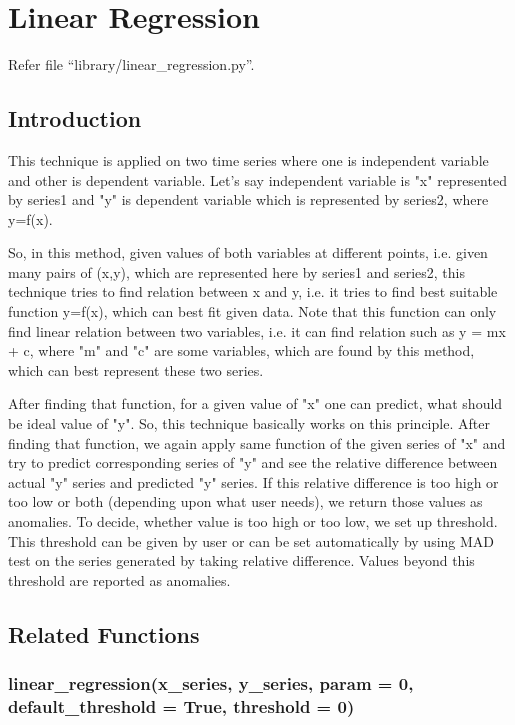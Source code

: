 \chapter{Linear Regression}

Refer file ``library/linear\_regression.py''.

\section{Introduction}

This technique is applied on two time series where one is independent variable 
and other is dependent variable. Let's say independent variable 
is "x" represented by series1 and "y" is dependent variable which is 
represented by series2, where y=f(x). 

So, in this method, given values of both variables at different points, i.e. 
given many pairs of (x,y), which are represented here by series1 and series2, 
this technique tries to find relation between x and y, i.e. it tries to find 
best suitable function y=f(x), which can best fit given data. Note that this 
function can only find linear relation between two variables, i.e. it can find 
relation such as y = mx + c, where "m" and "c" are some variables, which are 
found by this method, which can best represent these two series. 

After finding that function, for a given value of "x" one can predict, what 
should be ideal value of "y". So, this technique basically works on this 
principle. After finding that function, we again apply same function of the 
given series of "x" and try to predict corresponding series of "y" and see the 
relative difference between actual "y" series and predicted "y" series. If this 
relative difference is too high or too low or both (depending upon 
what user needs), we return those values as anomalies. To decide, whether value 
is too high or too low, we set up threshold. This threshold can be given by user 
or can be set automatically by using MAD test on the series generated by taking 
relative difference. Values beyond this threshold are reported as anomalies.

\section{Related Functions}

\subsection{linear\_regression(x\_series, y\_series, param = 0, 
default\_threshold = True, threshold = 0)}

